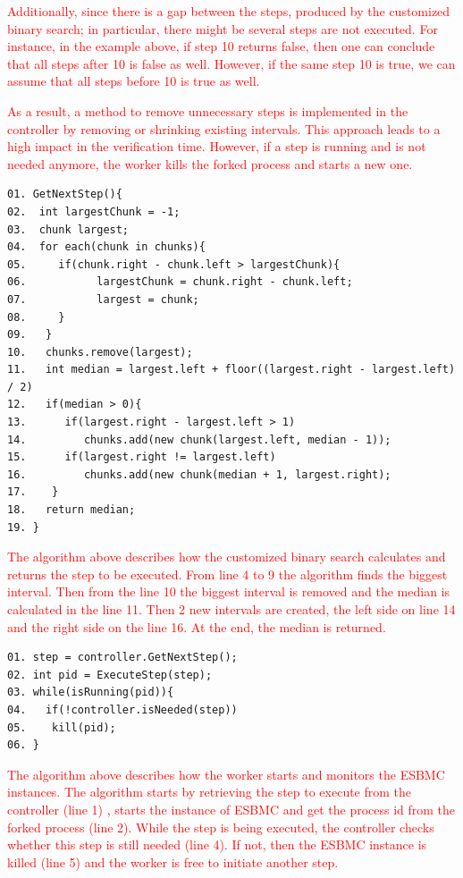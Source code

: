 \textcolor{Red}{Additionally, since there is a gap between the steps, produced by the customized binary search; in particular, there might be several steps are not executed. For instance, in the example above, if step 10 returns false, then one can conclude that all steps after 10 is false as well. However, if the same step 10 is true, we can assume that all steps before 10 is true as well.}

\textcolor{Red}{As a result, a method to remove unnecessary steps is implemented in the controller by removing or shrinking existing intervals. This approach leads to a high impact in the verification time. However, if a step is running and is not needed anymore, the worker kills the forked process and starts a new one.}
\begin{lstlisting}
01. GetNextStep(){
02.  int largestChunk = -1;
03.  chunk largest;
04.  for each(chunk in chunks){
05.     if(chunk.right - chunk.left > largestChunk){
06.           largestChunk = chunk.right - chunk.left;
07.           largest = chunk;
08.     }
09.   }	
10.   chunks.remove(largest);	
11.   int median = largest.left + floor((largest.right - largest.left) / 2)
12.   if(median > 0){
13.      if(largest.right - largest.left > 1)
14.         chunks.add(new chunk(largest.left, median - 1));	
15.      if(largest.right != largest.left)
16.         chunks.add(new chunk(median + 1, largest.right);
17.    }
18.   return median;
19. }
\end{lstlisting}
\textcolor{Red}{The algorithm above describes how the customized binary search calculates and returns the step to be executed. From line 4 to 9 the algorithm finds the biggest interval. Then from the line 10 the biggest interval is removed and the median is calculated in the line 11. Then 2 new intervals are created, the left side on line 14 and the right side on the line 16. At the end, the median is returned.}

\begin{lstlisting}
01. step = controller.GetNextStep();
02. int pid = ExecuteStep(step);
03. while(isRunning(pid)){
04.   if(!controller.isNeeded(step))
05.    kill(pid);
06. }     
\end{lstlisting}
\textcolor{Red}{The algorithm above describes how the worker starts and monitors the ESBMC instances. The algorithm starts by retrieving the step to execute from the controller (line 1) , starts the instance of ESBMC and get the process id from the forked process (line 2). While the step is being executed, the controller checks whether this step is still needed (line 4). If not, then the ESBMC instance is killed (line 5) and the worker is free to initiate another step.}

